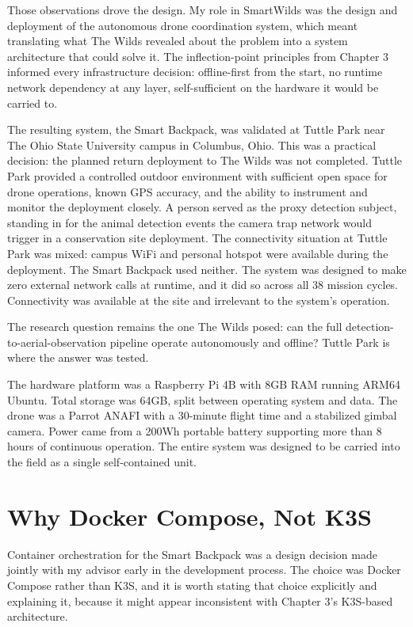 Those observations drove the design. My role in SmartWilds was the design and deployment of the autonomous drone coordination system, which meant translating what The Wilds revealed about the problem into a system architecture that could solve it. The inflection-point principles from Chapter 3 informed every infrastructure decision: offline-first from the start, no runtime network dependency at any layer, self-sufficient on the hardware it would be carried to.

The resulting system, the Smart Backpack, was validated at Tuttle Park near The Ohio State University campus in Columbus, Ohio. This was a practical decision: the planned return deployment to The Wilds was not completed. Tuttle Park provided a controlled outdoor environment with sufficient open space for drone operations, known GPS accuracy, and the ability to instrument and monitor the deployment closely. A person served as the proxy detection subject, standing in for the animal detection events the camera trap network would trigger in a conservation site deployment. The connectivity situation at Tuttle Park was mixed: campus WiFi and personal hotspot were available during the deployment. The Smart Backpack used neither. The system was designed to make zero external network calls at runtime, and it did so across all 38 mission cycles. Connectivity was available at the site and irrelevant to the system's operation.

The research question remains the one The Wilds posed: can the full detection-to-aerial-observation pipeline operate autonomously and offline? Tuttle Park is where the answer was tested.

The hardware platform was a Raspberry Pi 4B with 8GB RAM running ARM64 Ubuntu. Total storage was 64GB, split between operating system and data. The drone was a Parrot ANAFI with a 30-minute flight time and a stabilized gimbal camera. Power came from a 200Wh portable battery supporting more than 8 hours of continuous operation. The entire system was designed to be carried into the field as a single self-contained unit.

\section{Why Docker Compose, Not K3S}
\label{sec:ch4_smartfields}
Container orchestration for the Smart Backpack was a design decision made jointly with my advisor early in the development process. The choice was Docker Compose rather than K3S, and it is worth stating that choice explicitly and explaining it, because it might appear inconsistent with Chapter 3's K3S-based architecture.


